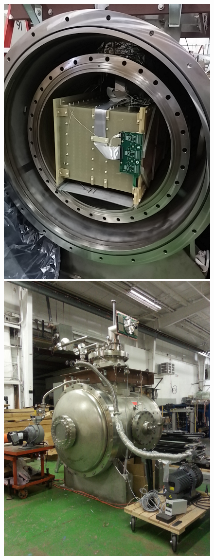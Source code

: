 \begin{figure}[htb]
\centering
\includegraphics[scale=0.18]{Chapter-3/Images/Cryostat1.jpg}
\includegraphics[scale=0.07]{Chapter-3/Images/Cryostat2.jpg}

\end{figure}
